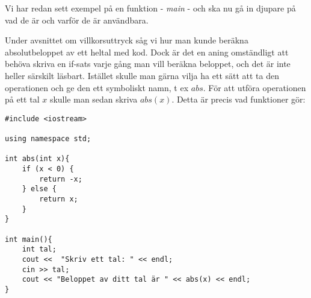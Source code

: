 Vi har redan sett exempel på en funktion - \emph{main} - och ska nu gå in djupare på vad de är och varför de är användbara.

Under avsnittet om villkorsuttryck såg vi hur man kunde beräkna absolutbeloppet av ett heltal med kod. Dock är det en aning omständligt att behöva skriva en if-sats varje gång man vill beräkna beloppet, och det är inte heller särskilt läsbart. Istället skulle man gärna vilja ha ett sätt att ta den operationen och ge den ett symboliskt namn, t ex $abs$. För att utföra operationen på ett tal $x$ skulle man sedan skriva $abs(x)$. Detta är precis vad funktioner gör:

\begin{lstlisting}
#include <iostream>

using namespace std;

int abs(int x){
	if (x < 0) {
		return -x;
	} else {
		return x;
	}
}

int main(){
	int tal;
	cout <<  "Skriv ett tal: " << endl;
	cin >> tal;
	cout << "Beloppet av ditt tal är " << abs(x) << endl;
}
\end{lstlisting}


